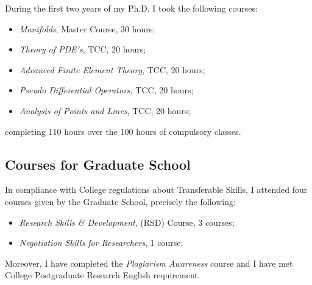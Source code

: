 \documentclass[a4paper,11pt,onecolumn]{article}
\begin{document}
During the first two years of my Ph.D. I took the following courses:
\begin{itemize}
\item \textit{Manifolds}, Master Course, 30 hours;
\item \textit{Theory of PDE's}, TCC, 20 hours;
\item \textit{Advanced Finite Element Theory}, TCC, 20 hours;
\item \textit{Pseudo Differential Operators}, TCC, 20 hours;
\item \textit{Analysis of Points and Lines}, TCC, 20 hours;
\end{itemize}
completing 110 hours over the 100 hours of compulsory classes.

\subsection{Courses for Graduate School}

In compliance with College regulations about Transferable Skills, I attended
four courses given by the Graduate School, precisely the following:

\begin{itemize}
\item \textit{Research Skills \& Development}, (RSD) Course, 3 courses;
\item \textit{Negotiation Skills for Researchers}, 1 course.
\end{itemize}

Moreover, I have completed the \textit{Plagiarism Awareness} course and I have
met College Postgraduate Research English requirement.



\end{document}
